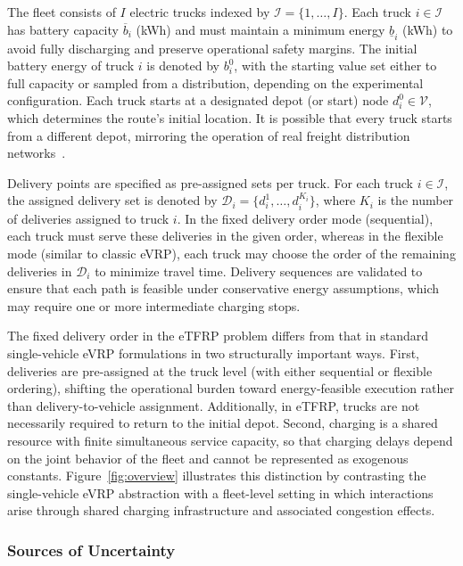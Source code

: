 \documentclass[a4paper,fleqn]{cas-sc}
\begin{document}
The fleet consists of $I$ electric trucks indexed by $\mathcal{I}=\{1,\ldots,I\}$. Each truck $i \in \mathcal{I}$ has battery capacity $\overline{b}_i$ (kWh) and must maintain a minimum energy $\underline{b}_i$ (kWh) to avoid fully discharging and preserve operational safety margins. The initial battery energy of truck $i$ is denoted by $b_i^0$, with the starting value set either to full capacity or sampled from a distribution, depending on the experimental configuration. Each truck starts at a designated depot (or start) node $d_{i}^0\in\mathcal{V}$, which determines the route's initial location. It is possible that every truck starts from a different depot, mirroring the operation of real freight distribution networks~\cite{MOGALE2025111315}.

Delivery points are specified as pre-assigned sets per truck. 
For each truck $i\in\mathcal{I}$, the assigned delivery set is denoted by $\mathcal{D}_i=\{d_{i}^1,\ldots,d_{i}^{K_i}\}$, where $K_i$ is the number of deliveries assigned to truck $i$. In the fixed delivery order mode (sequential), each truck must serve these deliveries in the given order, whereas in the flexible mode (similar to classic eVRP), each truck may choose the order of the remaining deliveries in $\mathcal{D}_i$ to minimize travel time.
Delivery sequences are validated to ensure that each path is feasible under conservative energy assumptions, which may require one or more intermediate charging stops. 

The fixed delivery order in the eTFRP problem differs from that in standard single-vehicle eVRP formulations in two structurally important ways.
First, deliveries are pre-assigned at the truck level (with either sequential or flexible ordering), shifting the operational burden toward energy-feasible execution rather than delivery-to-vehicle assignment. Additionally, in eTFRP, trucks are not necessarily required to return to the initial depot.
Second, charging is a shared resource with finite simultaneous service capacity, so that charging delays depend on the joint behavior of the fleet and cannot be represented as exogenous constants.
Figure~\ref{fig:overview} illustrates this distinction by contrasting the single-vehicle eVRP abstraction with a fleet-level setting in which interactions arise through shared charging infrastructure and associated congestion effects. 

\subsubsection{Sources of Uncertainty}
\label{sec:unc}
\end{document}
